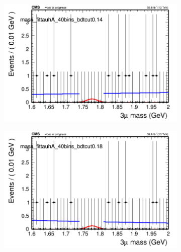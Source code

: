\begin{figure}[H]
\begin{subfigure}{0.2\textwidth}
        \caption{}
    \end{subfigure}
    \begin{subfigure}{0.2\textwidth}
        \includegraphics[width=\textwidth]{power_law/plots/tauhA/massfit_tauhA_40bins_bdtcut0.14.png}
        \caption{}
    \end{subfigure}
    \begin{subfigure}{0.2\textwidth}
        \includegraphics[width=\textwidth]{power_law/plots/tauhA/massfit_tauhA_40bins_bdtcut0.18.png}
        \caption{}
    \end{subfigure}
    \begin{subfigure}{0.2\textwidth}

\end{subfigure}
\end{figure}

